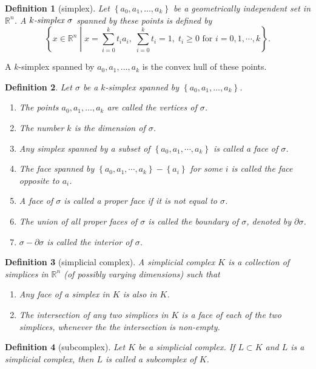 \documentclass{report}
\newtheorem{definition}{Definition}[section]
\theoremstyle{nonumberplain}
\begin{document}
\begin{definition}[simplex]
Let $\left\{a_0, a_1, \ldots, a_k\right\}$ be a geometrically independent set in $\mathbb{R}^n$. A $\emph{$k$-simplex } \sigma$ spanned by these points is defined by
$$
\left\{x\in \mathbb{R}^n\;\left|\; x=\sum_{i=0}^k t_i a_i,\;\sum_{i=0}^k t_i=1,\;t_i \geq 0\text{ for }i = 0,1,\cdots, k\right.\right\}.
$$
\end{definition}

\noindent A $k$-simplex spanned by $a_0, a_1, \ldots, a_k$ is the convex hull of these points.
\begin{definition}
Let $\sigma$ be a $k$-simplex spanned by $\left\{a_0, a_1, \ldots, a_k\right\}$.
\begin{enumerate}
	\item The points $a_0, a_1, \ldots, a_k$ are called the \emph{vertices} of $\sigma$.
	\item The number $k$ is the \emph{dimension} of $\sigma$.
	\item Any simplex spanned by a subset of $\left\{a_0, a_1, \cdots, a_k\right\}$ is called a \emph{face} of $\sigma$. 
	\item The face spanned by $\left\{a_0, a_1, \cdots, a_k\right\}-\left\{a_i\right\}$ for some $i$ is called the \emph{face opposite} to $a_i$.
	\item A face of $\sigma$ is called a \emph{proper face} if it is not equal to $\sigma$.
	\item The union of all proper faces of $\sigma$ is called the \emph{boundary} of $\sigma$, denoted by $\partial \sigma$.
	\item $\sigma-\partial \sigma$ is called the \emph{interior} of $\sigma$.
\end{enumerate}
\end{definition}
\begin{definition}[simplicial complex]
A \emph{simplicial complex} $K$ is a collection of simplices in $\mathbb{R}^n$ (of possibly varying dimensions) such that
\begin{enumerate}
	\item Any face of a simplex in $K$ is also in $K$.
	\item The intersection of any two simplices in $K$ is a face of each of the two simplices, whenever the the intersection is non-empty.
\end{enumerate}
\end{definition}

\begin{definition}[subcomplex]
Let $K$ be a simplicial complex. If $L\subset K$ and $L$ is a simplicial complex, then $L$ is called a \emph{subcomplex} of $K$.
\end{definition}
\end{document}
